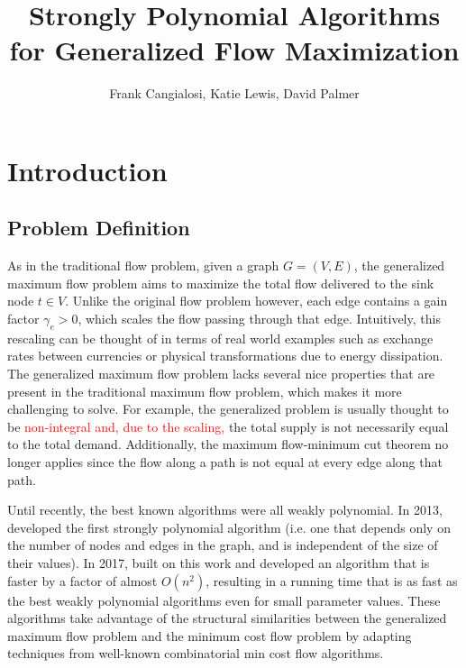 \documentclass[12pt]{article}
\title{Strongly Polynomial Algorithms for Generalized Flow Maximization}
\author{Frank Cangialosi, Katie Lewis, David Palmer}
\date{}
\theoremstyle{definition}
\newcommand{\rewrite}[1]{\textcolor{red}{#1}}
\begin{document}
\maketitle
\section{Introduction}
	\subsection{Problem Definition} As in the traditional flow problem, given a graph $G = (V,E)$, the generalized maximum flow problem aims to maximize the total flow delivered to the sink node $t \in V$. Unlike the original flow problem however, each edge contains a gain factor $\gamma_e > 0$, which scales the flow passing through that edge. Intuitively, this rescaling can be thought of in terms of real world examples such as exchange rates between currencies or physical transformations due to energy dissipation. The generalized maximum flow problem lacks several nice properties that are present in the traditional maximum flow problem, which makes it more challenging to solve. For example, the generalized problem is usually thought to be \rewrite{non-integral and, due to the scaling,} the total supply is not necessarily equal to the total demand. Additionally, the maximum flow-minimum cut theorem no longer applies since the flow along a path is not equal at every edge along that path.
    
    Until recently, the best known algorithms were all weakly polynomial. In 2013, \cite{Vegh2013} developed the first strongly polynomial algorithm (i.e. one that depends only on the number of nodes and edges in the graph, and is independent of the size of their values). In 2017, \cite{Olver2017} built on this work and developed an algorithm that is faster by a factor of almost $O(n^2)$, resulting in a running time that is as fast as the best weakly polynomial algorithms even for small parameter values. These algorithms take advantage of the structural similarities between the generalized maximum flow problem and the minimum cost flow problem by adapting techniques from well-known combinatorial min cost flow algorithms. 
    
\end{document}
